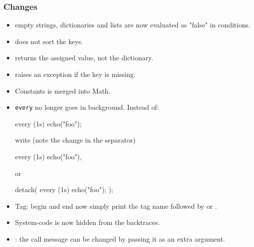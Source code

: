 \subsubsection{Changes}
\begin{itemize}
\item empty strings, dictionaries and lists are now evaluated as
  "false" in conditions.
\item {} does not sort the keys.
\item {} returns the assigned value, not the
  dictionary.
\item {} raises an exception if the key is missing.
\item Constants is merged into Math.
\item \lstinline|every| no longer goes in background.  Instead of:

\begin{urbiunchecked}
every (1s) echo("foo");
\end{urbiunchecked}

  \noindent
  write (note the change in the separator)

\begin{urbiunchecked}
every (1s) echo("foo"),
\end{urbiunchecked}

  \noindent
  or

\begin{urbiunchecked}
detach({ every (1s) echo("foo"); });
\end{urbiunchecked}

\item Tag: begin and end now simply print the tag name followed by
   or .
\item System-code is now hidden from the backtraces.
\item {}: the call message can be changed by passing it
  as an extra argument.
\end{itemize}


